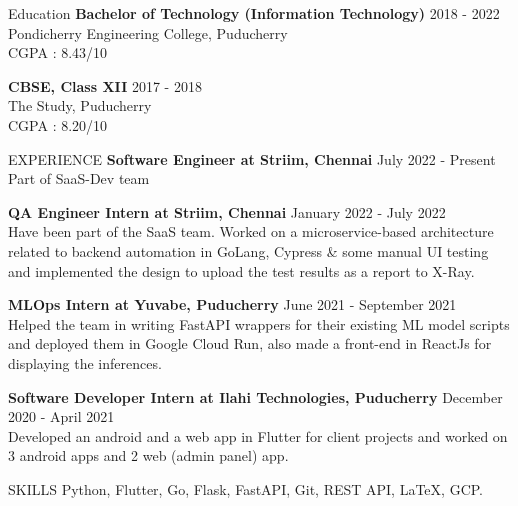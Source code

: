 \documentclass{template}
\begin{document}
\begin{rSection}{Education}
{\bf Bachelor of Technology (Information Technology)} \hfill {2018 - 2022}
\\ 
Pondicherry Engineering College, Puducherry \\
CGPA : 8.43/10

{\textbf{CBSE, Class XII}} \hfill 2017 - 2018\\
The Study, Puducherry \\
CGPA : 8.20/10

\end{rSection}

\begin{rSection}{EXPERIENCE}
\textbf{Software Engineer at Striim, Chennai} \hfill July 2022 - Present \\
Part of SaaS-Dev team

\textbf{QA Engineer Intern at Striim, Chennai} \hfill January 2022 - July 2022 \\
Have been part of the SaaS team. Worked on a microservice-based architecture related to backend automation in GoLang, Cypress \& some manual UI testing and implemented the design to upload the test results as a report to X-Ray.

\textbf{MLOps Intern at Yuvabe, Puducherry} \hfill June 2021 - September 2021 \\
Helped the team in writing FastAPI wrappers for their existing ML model scripts and deployed them in Google Cloud Run, also made a front-end in ReactJs for displaying the inferences.

\textbf{Software Developer Intern at Ilahi Technologies, Puducherry} \hfill December 2020 - April 2021 \\
Developed an android and a web app in Flutter for client projects and worked on 3 android apps and 2 web (admin panel) app.

\end{rSection} 

\begin{rSection}{SKILLS}
Python, Flutter, Go, Flask, FastAPI, Git, REST API, \LaTeX, GCP.

\end{rSection}
\end{document}
